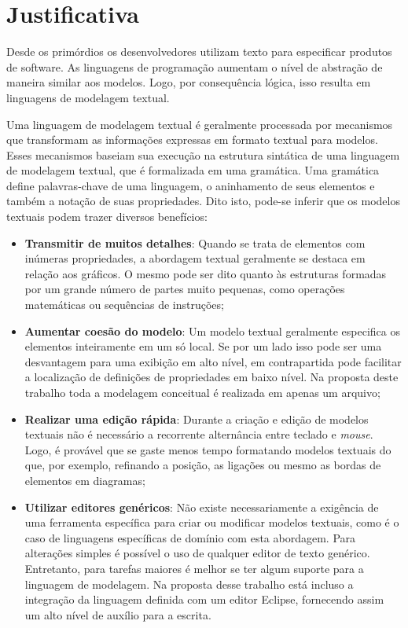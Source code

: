 \section{Justificativa}

Desde os primórdios os desenvolvedores utilizam texto para especificar produtos de software. 
As linguagens de programação aumentam o nível de abstração de maneira similar aos modelos. 
Logo, por consequência lógica, isso resulta em linguagens de modelagem textual.

Uma linguagem de modelagem textual é geralmente processada por mecanismos que transformam as informações expressas em formato textual para modelos. 
Esses mecanismos baseiam sua execução na estrutura sintática de uma linguagem de modelagem textual, que é formalizada em uma gramática. 
Uma gramática define palavras-chave de uma linguagem, o aninhamento de seus elementos e também a notação de suas propriedades. 
Dito isto, pode-se inferir que os modelos textuais podem trazer diversos benefícios:

\begin{itemize}
    \item \textbf{Transmitir de muitos detalhes}: Quando se trata de elementos com inúmeras propriedades, a abordagem textual geralmente se destaca em relação aos gráficos. 
    O mesmo pode ser dito quanto às estruturas formadas por um grande número de partes muito pequenas, como operações matemáticas ou sequências de instruções;
    \item \textbf{Aumentar coesão do modelo}: Um modelo textual geralmente especifica os elementos inteiramente em um só local. 
    Se por um lado isso pode ser uma desvantagem para uma exibição em alto nível, em contrapartida pode facilitar a localização de definições de propriedades em baixo nível. 
    Na proposta deste trabalho toda a modelagem conceitual é realizada em apenas um arquivo;
    \item \textbf{Realizar uma edição rápida}: Durante a criação e edição de modelos textuais não é necessário a recorrente alternância entre teclado e \textit{mouse}. 
    Logo, é provável que se gaste menos tempo formatando modelos textuais do que, por exemplo, refinando a posição, as ligações ou mesmo as bordas de elementos em diagramas;
    \item \textbf{Utilizar editores genéricos}: Não existe necessariamente a exigência de uma ferramenta específica para criar ou modificar modelos textuais, como é o caso de linguagens específicas de domínio com esta abordagem. 
    Para alterações simples é possível o uso de qualquer editor de texto genérico. 
    Entretanto, para tarefas maiores é melhor se ter algum suporte para a linguagem de modelagem. 
    Na proposta desse trabalho está incluso a integração da linguagem definida com um editor Eclipse, fornecendo assim um alto nível de auxílio para a escrita.
\end{itemize}


